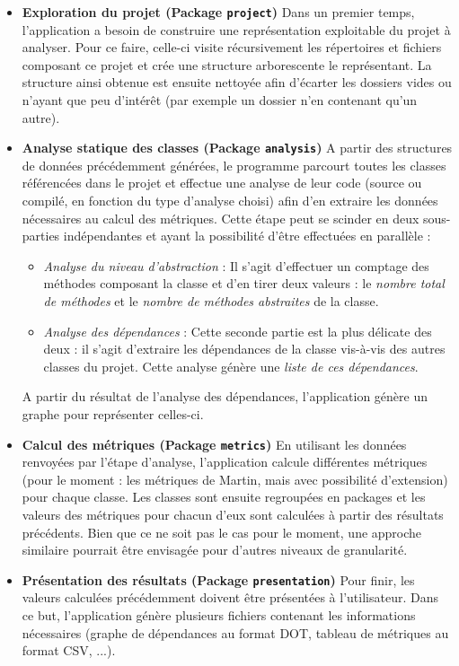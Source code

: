 \documentclass{scrartcl}
\begin{document}
    \begin{itemize}
        \bigbreak 
        \item[] \textbf{Exploration du projet (Package \texttt{project})} Dans un premier temps, l'application a besoin de construire une représentation exploitable du projet à analyser. Pour ce faire, celle-ci visite récursivement les répertoires et fichiers composant ce projet et crée une structure arborescente le représentant. La structure ainsi obtenue est ensuite nettoyée afin d'écarter les dossiers vides ou n'ayant que peu d'intérêt (par exemple un dossier n'en contenant qu'un autre).

        \bigbreak 
        \item[] \textbf{Analyse statique des classes (Package \texttt{analysis})} A partir des structures de données précédemment générées, le programme parcourt toutes les classes référencées dans le projet et effectue une analyse de leur code (source ou compilé, en fonction du type d'analyse choisi) afin d'en extraire les données nécessaires au calcul des métriques. Cette étape peut se scinder en deux sous-parties indépendantes et ayant la possibilité d'être effectuées en parallèle :
    	\begin{itemize}
    		\item \textit{Analyse du niveau d'abstraction} : Il s'agit d'effectuer un comptage des méthodes composant la classe et d'en tirer deux valeurs : le \emph{nombre total de méthodes} et le \emph{nombre de méthodes abstraites} de la classe.
    		\item \textit{Analyse des dépendances} : Cette seconde partie est la plus délicate des deux : il s'agit d'extraire les dépendances de la classe vis-à-vis des autres classes du projet. Cette analyse génère une \emph{liste de ces dépendances}.
    	\end{itemize}
	    A partir du résultat de l'analyse des dépendances, l'application génère un graphe pour représenter celles-ci.
	
	    \bigbreak 
	    \item[] \textbf{Calcul des métriques (Package \texttt{metrics})} En utilisant les données renvoyées par l'étape d'analyse, l'application calcule différentes métriques (pour le moment : les métriques de Martin, mais avec possibilité d'extension) pour chaque classe. Les classes sont ensuite regroupées en packages et les valeurs des métriques pour chacun d'eux sont calculées à partir des résultats précédents. Bien que ce ne soit pas le cas pour le moment, une approche similaire pourrait être envisagée pour d'autres niveaux de granularité.
	
	    \bigbreak 
	    \item[] \textbf{Présentation des résultats (Package \texttt{presentation})} Pour finir, les valeurs calculées précédemment doivent être présentées à l'utilisateur. Dans ce but, l'application génère plusieurs fichiers contenant les informations nécessaires (graphe de dépendances au format DOT, tableau de métriques au format CSV, ...).
	\end{itemize}
\end{document}
